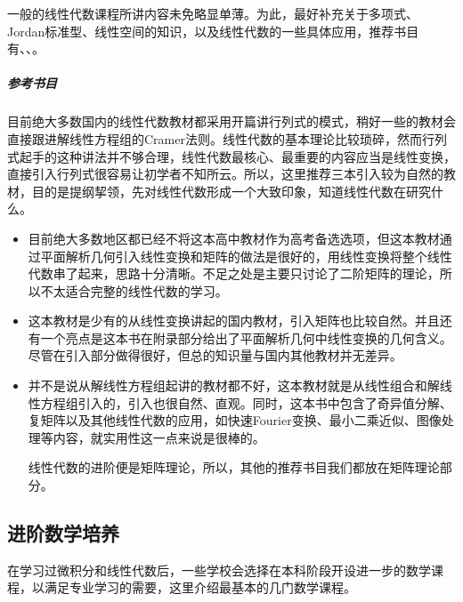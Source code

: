 一般的线性代数课程所讲内容未免略显单薄。为此，最好补充关于多项式、Jordan标准型、线性空间的知识，以及线性代数的一些具体应用，推荐书目有\cite[Gilbert Strang\kern1em 线性代数：第5版]{线性代数5}、\cite[线性代数应该这样学]{阿克斯勒杜现昆2016线性代数应该这样学}、\cite[高等代数学]{张贤科2004高等代数学}。

\subparagraph{参考书目}\mbox{}

目前绝大多数国内的线性代数教材都采用开篇讲行列式的模式，稍好一些的教材会直接跟进解线性方程组的Cramer法则。线性代数的基本理论比较琐碎，然而行列式起手的这种讲法并不够合理，线性代数最核心、最重要的内容应当是线性变换，直接引入行列式很容易让初学者不知所云。所以，这里推荐三本引入较为自然的教材，目的是提纲挈领，先对线性代数形成一个大致印象，知道线性代数在研究什么。

\begin{itemize}
	\item \cite[普通高中课程标准实验教科书 数学 选修4-2 A版 矩阵与变换]{矩阵与变换}

	      目前绝大多数地区都已经不将这本高中教材作为高考备选选项，但这本教材通过平面解析几何引入线性变换和矩阵的做法是很好的，用线性变换将整个线性代数串了起来，思路十分清晰。不足之处是主要只讨论了二阶矩阵的理论，所以不太适合完整的线性代数的学习。
	\item \cite[邱志鹏、杨建新、钱雄平\kern1em 线性代数]{线性代数}

	      这本教材是少有的从线性变换讲起的国内教材，引入矩阵也比较自然。并且还有一个亮点是这本书在附录部分给出了平面解析几何中线性变换的几何含义。尽管在引入部分做得很好，但总的知识量与国内其他教材并无差异。

	\item \cite[Gilbert Strang\kern1em 线性代数：第5版]{线性代数5}

	      并不是说从解线性方程组起讲的教材都不好，这本教材就是从线性组合和解线性方程组引入的，引入也很自然、直观。同时，这本书中包含了奇异值分解、复矩阵以及其他线性代数的应用，如快速Fourier变换、最小二乘近似、图像处理等内容，就实用性这一点来说是很棒的。

	      线性代数的进阶便是矩阵理论，所以，其他的推荐书目我们都放在矩阵理论部分。
\end{itemize}
\subsection{进阶数学培养}

在学习过微积分和线性代数后，一些学校会选择在本科阶段开设进一步的数学课程，以满足专业学习的需要，这里介绍最基本的几门数学课程。

